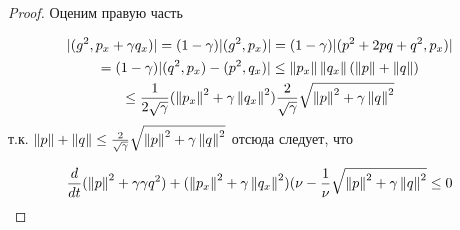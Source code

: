 \begin{proof}
    Оценим правую часть 

    \begin{gather*}
        |(g^2, p_x + \gamma q_x)| = (1 - \gamma)|(g^2, p_x)| = (1 - \gamma)|(p^2
        + 2pq + q^2, p_x)| \\*
        = (1 - \gamma)|(q^2, p_x) - (p^2, q_x)| \le \left\lVert p_x\right\rVert \left\lVert q_x\right\rVert
        (\left\lVert p\right\rVert + \left\lVert q\right\rVert) \\* \le
        \frac{1}{2\sqrt{\gamma}}(\left\lVert p_x\right\rVert^2 + \gamma \left\lVert q_x\right\rVert^2)
        \frac{2}{\sqrt{\gamma}}\sqrt{\left\lVert p\right\rVert^2 + \gamma \left\lVert q\right\rVert^2}
    \end{gather*}
    т.к. $\left\lVert p\right\rVert + \left\lVert q\right\rVert \le \frac{2}{\sqrt{\gamma}}\sqrt{\left\lVert p\right\rVert^2 +
        \gamma \left\lVert q\right\rVert^2}$ отсюда следует, что

    \begin{equation}
        \frac{d}{dt}(\left\lVert p\right\rVert^2 + \gamma \gamma{q}^2) + (\left\lVert p_x\right\rVert^2 + \gamma
        \left\lVert q_x\right\rVert^2) (\nu - \frac{1}{\nu} \sqrt{\left\lVert p\right\rVert^2 + \gamma \left\lVert q\right\rVert^2}
        \le 0
    \end{equation}

    
\end{proof}
